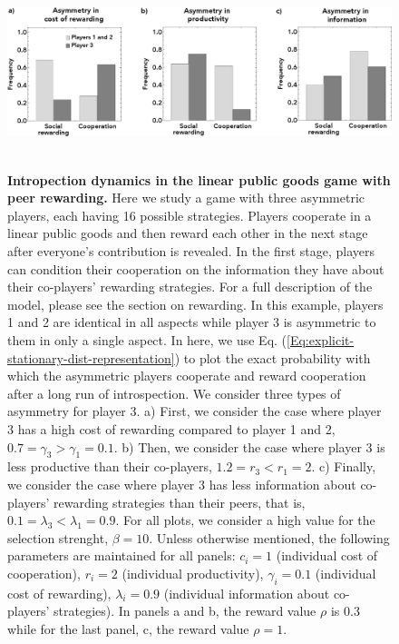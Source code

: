 \documentclass[11pt]{article}
\theoremstyle{plainCl1}
\theoremstyle{plainCl2}
\begin{document}
\clearpage
\begin{figure}
\centering
\includegraphics[width =  \textwidth]{figures/figure4.eps}~\\[0.4cm]
\caption{\onehalfspacing
\textbf{Intropection dynamics in the linear public goods game with peer rewarding.} Here we study a game with three asymmetric players, each having 16 possible strategies. Players cooperate in a linear public goods and then reward each other in the next stage after everyone's contribution is revealed. In the first stage, players can condition their cooperation on the information they have about their co-players' rewarding strategies. For a full description of the model, please see the section on rewarding. In this example, players 1 and 2 are identical in all aspects while player 3 is asymmetric to them in only a single aspect. In here, we use Eq. (\ref{Eq:explicit-stationary-dist-representation}) to plot the exact probability with which the asymmetric players cooperate and reward cooperation after a long run of introspection. We consider three types of asymmetry for player 3. a) First, we consider the case where player 3 has a high cost of rewarding compared to player 1 and 2, $0.7 = \gamma_3 > \gamma_1 = 0.1$. b) Then, we consider the case where player 3 is less productive than their co-players, $1.2 = r_3 < r_1 = 2$. c) Finally, we consider the case where player 3 has less information about co-players' rewarding strategies than their peers, that is, $0.1 = \lambda_3 < \lambda_1 = 0.9$. For all plots, we consider a high value for the selection strenght, $\beta = 10$. Unless otherwise mentioned, the following parameters are maintained for all panels: $c_i = 1$ (individual cost of cooperation), $r_i = 2$ (individual productivity), $\gamma_i = 0.1$ (individual cost of rewarding), $\lambda_i = 0.9$ (individual information about co-players' strategies). In panels a and b, the reward value $\rho$ is 0.3 while for the last panel, c, the reward value $\rho = 1$.}
\label{Fig:SocialRewarding}
\end{figure}

\clearpage

\newpage

\end{document}
